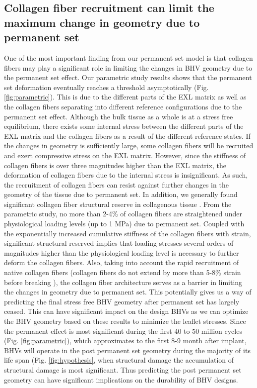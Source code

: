 \subsection{Collagen fiber recruitment can limit the maximum change in geometry due to permanent set}
	One of the most important finding from our permanent set model is that collagen fibers may play a significant role in limiting the changes in BHV geometry due to the permanent set effect. Our parametric study results shows that the permanent set deformation eventually reaches a threshold asymptotically (Fig. \ref{fig:parametric}). This is due to the different parts of the EXL matrix as well as the collagen fibers separating into different reference configurations due to the permanent set effect. Although the bulk tissue as a whole is at a stress free equilibrium, there exists some internal stress between the different parts of the EXL matrix and the collagen fibers as a result of the different reference states. If the changes in geometry is sufficiently large, some collagen fibers will be recruited and exert compressive stress on the EXL matrix. However, since the stiffness of collagen fibers is over three magnitudes higher than the EXL matrix, the deformation of collagen fibers due to the internal stress is insignificant. As such, the recruitment of collagen fibers can resist against further changes in the geometry of the tissue due to permanent set. In addition, we generally found significant collagen fiber structural reserve in collagenous tissue \cite{zhang_meso_2016}. From the parametric study, no more than 2-4\% of collagen fibers are straightened under physiological loading levels (up to 1 MPa) due to permanent set. Coupled with the exponentially increased cumulative stiffness of the collagen fibers with strain, significant structural reserved implies that loading stresses several orders of magnitudes higher than the physiological loading level is necessary to further deform the collagen fibers. Also, taking into account the rapid recruitment of native collagen fibers (collagen fibers do not extend by more than 5-8\% strain before breaking \cite{buehler_atomistic_2006}), the collagen fiber architecture serves as a barrier in limiting the changes in geometry due to permanent set. This potentially gives us a way of predicting the final stress free BHV geometry after permanent set has largely ceased. This can have significant impact on the design BHVs as we can optimize the BHV geometry based on these results to minimize the leaflet stresses. Since the permanent effect is most significant during the first 40 to 50 million cycles (Fig. \ref{fig:parametric}), which approximates to the first 8-9 month after implant, BHVs will operate in the post permanent set geometry during the majority of its life span (Fig. \ref{fig:hypothesis}, when structural damage the accumulation of structural damage is most significant. Thus predicting the post permanent set geometry can have significant implications on the durability of BHV designs.
	
